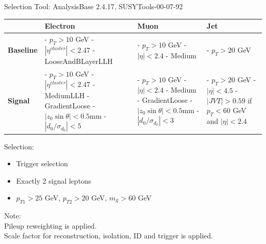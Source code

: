 \documentclass[mathserif,serif]{beamer}
\begin{document}
\begin{frame}{Selection}
\small
Tool: AnalysisBase 2.4.17, SUSYTools-00-07-92 \\

\centering
\begin{table}
\small
\begin{tabularx}{\textwidth}{p{1.5cm} | p{3cm} | p{3cm} | p{3cm}}
& \textbf{Electron} & \textbf{Muon} & \textbf{Jet}\\
\hline
\textbf{Baseline}
& - $p_T>10$ GeV \newline - $|\eta^{cluster}| < 2.47$ \newline - LooseAndBLayerLLH
& - $p_T>10$ GeV \newline - $|\eta| < 2.4$ \newline - Medium
& - $p_T>20$ GeV \\
\hline
\textbf{Signal}
& - $p_T > 10$ GeV \newline - $|\eta^{cluster}| < 2.47$ \newline - MediumLLH \newline - GradientLoose \newline - $|z_0 \sin \theta| < 0.5$mm \newline - $|d_0/\sigma_{d_0}| < 5$
& - $p_T > 10$ GeV \newline - $|\eta| < 2.4$ \newline - Medium \newline - GradientLoose \newline - $|z_0 \sin \theta| < 0.5$mm \newline - $|d_0/\sigma_{d_0}| < 3$
& - $p_T > 20$ GeV \newline - $|\eta|<4.5$ \newline \newline - $|JVT| > 0.59$ \newline if $p_T < 60$ GeV \newline and $|\eta| < 2.4$
\end{tabularx}
\end{table}

\raggedright
Selection:
\begin{itemize}
\item Trigger selection
\item Exactly 2 signal leptons
\item $p_{T1} > 25$ GeV, $p_{T2} > 20$ GeV, $m_{ll} > 60$ GeV
\end{itemize}

\tiny
Note: \\
Pileup reweighting is applied. \\
Scale factor for reconstruction, isolation, ID and trigger is applied.
\end{frame}
\end{document}
